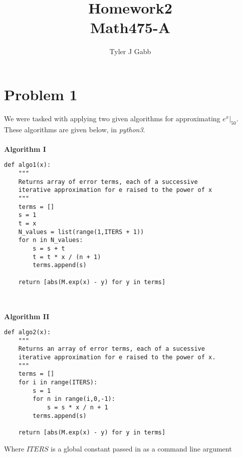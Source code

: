 \documentclass[11pt]{article}
\title{\textbf{Homework2\\
			   Math475-A}}
\author{Tyler J Gabb}
\date{}
\begin{document}
\maketitle

\section{Problem 1}
We were tasked with applying two given algorithms for approximating $e^{x}|_{50}$. These algorithms are given below, in \emph{python3}.
\\
\\
\textbf{Algorithm I}

\begin{lstlisting}
def algo1(x):
	"""
	Returns array of error terms, each of a successive 
	iterative approximation for e raised to the power of x
	"""
    terms = []
    s = 1
    t = x
    N_values = list(range(1,ITERS + 1))
    for n in N_values:
        s = s + t
        t = t * x / (n + 1)
        terms.append(s)

    return [abs(M.exp(x) - y) for y in terms] 
 
\end{lstlisting} 
\\

\textbf{Algorithm II} 
 
\begin{lstlisting}   
def algo2(x):
    """
    Returns an array of error terms, each of a sucessive
    iterative approximation for e raised to the power of x.
    """
    terms = []
    for i in range(ITERS):
        s = 1
        for n in range(i,0,-1):
            s = s * x / n + 1
        terms.append(s)
        
    return [abs(M.exp(x) - y) for y in terms]
\end{lstlisting}
Where $ITERS$ is a global constant passed in as a command line argument
\end{document}
